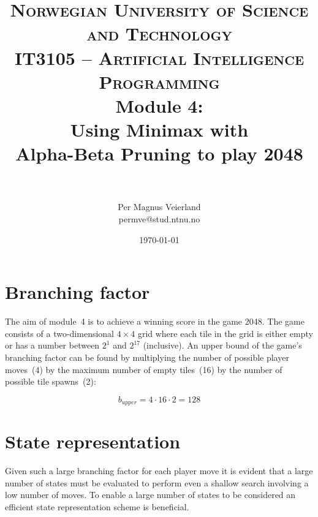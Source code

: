 

\usepackage{float}

\title{	
\normalfont \normalsize 
\textsc{Norwegian University of Science and Technology\\IT3105 -- Artificial Intelligence Programming}
\horrule{0.5pt} \\[0.4cm]
\huge Module 4:\\ Using Minimax with\\ Alpha-Beta Pruning to play 2048\\
\horrule{2pt} \\[0.5cm]
}

\author{Per Magnus Veierland\\permve@stud.ntnu.no}

\date{\normalsize\today}



\fancyfoot[C]{}
\maketitle

\newpage
{} %
\setcounter{page}{1}

\section*{Branching factor}

The aim of module~4 is to achieve a winning score in the game \textsc{2048}. The game consists of a two-dimensional $4\times 4$ grid where each tile in the grid is either empty or has a number between $2^1$ and $2^{17}$ (inclusive). An upper bound of the game's branching factor can be found by multiplying the number of possible player moves~(4) by the maximum number of empty tiles~(16) by the number of possible tile spawns~(2):

\begin{displaymath}
b_{\textit{upper}} = 4 \cdot 16 \cdot 2 = 128
\end{displaymath}

\section*{State representation}

Given such a large branching factor for each player move it is evident that a large number of states must be evaluated to perform even a shallow search involving a low number of moves. To enable a large number of states to be considered an efficient state representation scheme is beneficial.

